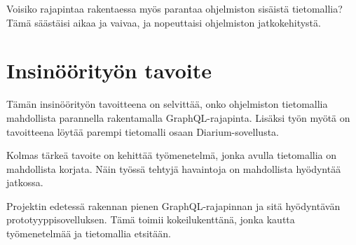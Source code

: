 Voisiko rajapintaa rakentaessa myös parantaa ohjelmiston sisäistä
tietomallia? Tämä säästäisi aikaa ja vaivaa, ja nopeuttaisi ohjelmiston
jatkokehitystä.

\hypertarget{insinuxf6uxf6rityuxf6n-tavoite}{%
\section{Insinöörityön tavoite}\label{insinuxf6uxf6rityuxf6n-tavoite}}

Tämän insinöörityön tavoitteena on selvittää, onko ohjelmiston
tietomallia mahdollista parannella rakentamalla GraphQL-rajapinta.
Lisäksi työn myötä on tavoitteena löytää parempi tietomalli osaan
Diarium-sovellusta.

Kolmas tärkeä tavoite on kehittää työmenetelmä, jonka avulla tietomallia
on mahdollista korjata. Näin työssä tehtyjä havaintoja on mahdollista
hyödyntää jatkossa.

Projektin edetessä rakennan pienen GraphQL-rajapinnan ja sitä
hyödyntävän prototyyppisovelluksen. Tämä toimii kokeilukenttänä, jonka
kautta työmenetelmää ja tietomallia etsitään.
